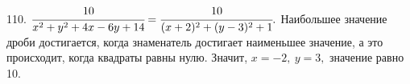 110. $\cfrac{10}{x^2+y^2+4x-6y+14}=\cfrac{10}{(x+2)^2+(y-3)^2+1}.$ Наибольшее значение дроби достигается, когда знаменатель достигает наименьшее значение, а это происходит, когда квадраты равны нулю. Значит, $x=-2,\ y=3,$ значение равно 10.\\
